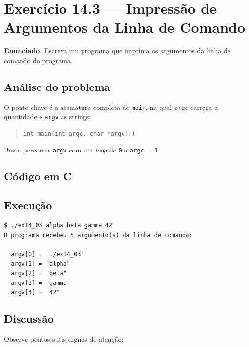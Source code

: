 \documentclass[11pt,a4paper]{article}
\begin{document}
\section{Exerc\'icio 14.3 --- Impress\~ao de Argumentos da Linha de Comando}

\begin{enunciado}
\textbf{Enunciado.} Escreva um programa que imprima os argumentos da linha de comando do programa.
\end{enunciado}

\subsection*{An\'alise do problema}

O ponto-chave \'e a assinatura completa de \texttt{main}, na qual \texttt{argc} carrega a quantidade e \texttt{argv} as strings:
\begin{quote}\texttt{int main(int argc, char *argv[])}\end{quote}
\noindent Basta percorrer \texttt{argv} com um \emph{loop} de \texttt{0} a \texttt{argc - 1}.

\subsection*{C\'odigo em C}



\subsection*{Execu\c{c}\~ao}

\begin{saidabox}
\begin{lstlisting}[style=terminal]
$ ./ex14_03 alpha beta gamma 42
O programa recebeu 5 argumento(s) da linha de comando:

  argv[0] = "./ex14_03"
  argv[1] = "alpha"
  argv[2] = "beta"
  argv[3] = "gamma"
  argv[4] = "42"
\end{lstlisting}
\end{saidabox}

\subsection*{Discuss\~ao}

Observe pontos sutis dignos de aten\c{c}\~ao:
\end{document}
